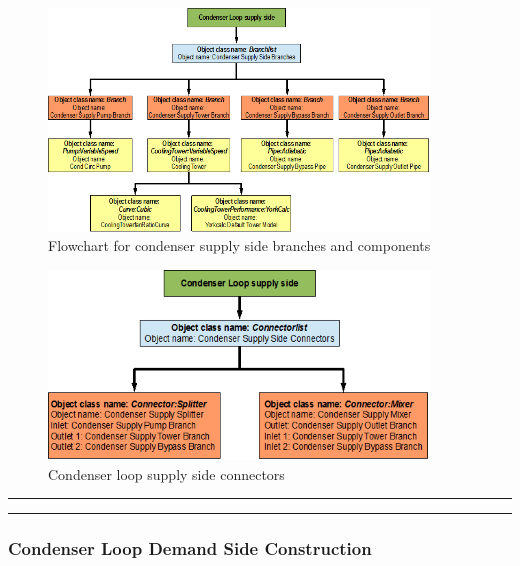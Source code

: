 \begin{figure}[hbtp] %
\centering
\includegraphics[width=0.9\textwidth, height=0.9\textheight, keepaspectratio=true]{media/image032.png}
\caption{Flowchart for condenser supply side branches and components \protect \label{fig:flowchart-for-condenser-supply-side-branches}}
\end{figure}

\begin{figure}[hbtp] %
\centering
\includegraphics[width=0.9\textwidth, height=0.9\textheight, keepaspectratio=true]{media/image033.png}
\caption{Condenser loop supply side connectors \protect \label{fig:condenser-loop-supply-side-connectors}}
\end{figure}

\begin{center}\rule{0.5\linewidth}{\linethickness}\end{center}

\begin{center}\rule{0.5\linewidth}{\linethickness}\end{center}

\subsubsection{Condenser Loop Demand Side Construction}\label{condenser-loop-demand-side-construction-001}


